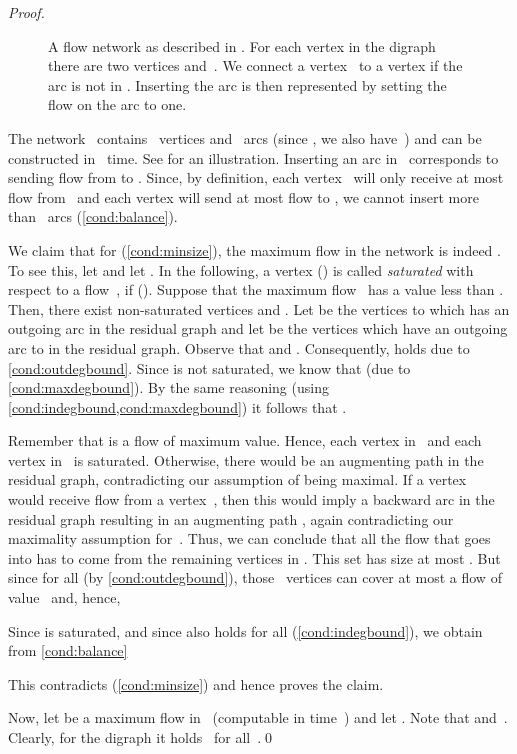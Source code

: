 \documentclass[a4paper,11pt]{article}
\theoremstyle{remark}
\theoremstyle{plain}
\theoremstyle{definition}
\begin{document}
\begin{proof}
\begin{figure}[t!]
\caption{A flow network as described in . For each vertex  in the digraph~ there are two vertices  and~. We connect a vertex~ to a vertex  if the arc  is not in . Inserting the arc  is then represented by setting the flow on the arc  to one.
}
\label{fig:flownw}
\end{figure}
The network~ contains~ vertices and~ arcs (since , we also have~) and can be constructed in~ time.
See  for an illustration.
Inserting an arc  in~ corresponds to sending flow from  to . Since, by definition,
each vertex~ will only receive at most~ flow from~ and each vertex  will send at most  flow to , we cannot insert more than~ arcs (\cref{cond:balance}).

We claim that for  (\cref{cond:minsize}), the maximum flow in the network is indeed .
To see this, let  and let .
	In the following, a vertex  () is called \emph{saturated} with respect to a flow~, if  ().
	Suppose that the maximum flow~ has a value less than .
	Then, there exist non-saturated vertices  and .
	Let   be the vertices to which  has an outgoing arc in the residual graph and let  be the vertices which have an outgoing arc to  in the residual graph.
	Observe that  and .
	Consequently,  holds due to \cref{cond:outdegbound}.
	Since  is not saturated, we know that  (due to \cref{cond:maxdegbound}).
	By the same reasoning (using \cref{cond:indegbound,cond:maxdegbound}) it follows that .

	Remember that  is a flow of maximum value. Hence, each vertex in~ and each vertex in~ is saturated. 
	Otherwise, there would be an augmenting path in the residual graph, contradicting our assumption of  being maximal. 
	If a vertex~ would receive flow from a vertex~, then this would imply a backward arc in the residual graph resulting in an augmenting path , again contradicting our maximality assumption for~. 
	Thus, we can conclude that all the flow that goes into  has to come from the remaining vertices in . This set has size at most .
	But since  for all  (by \cref{cond:outdegbound}), those~ vertices can cover at most a flow of value~ and, hence, 
	
	Since  is saturated, and since also  holds for all  (\cref{cond:indegbound}), we obtain from \cref{cond:balance}
	
	This contradicts  (\cref{cond:minsize}) and hence proves the claim.

	Now, let  be a maximum flow in~ (computable in  time~\cite{Orlin13}) and let . Note that  and~.
	Clearly, for the digraph  it holds~ for all~.\qed
\end{proof}
\end{document}
